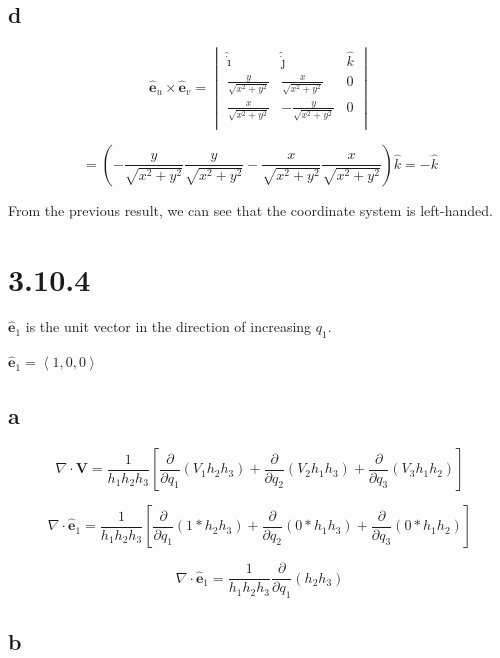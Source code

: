 \documentclass[12pt]{article}
\begin{document}
\subsection{d}

\[
    \hat{\textbf{e}}_u \times \hat{\textbf{e}}_v =
    \begin{vmatrix}
        \hat{\dot{\imath}}         & \hat{\dot{\jmath}}          & \hat{k} \\
        \frac{y}{\sqrt{x^2 + y^2}} & \frac{x}{\sqrt{x^2 + y^2}}  & 0       \\
        \frac{x}{\sqrt{x^2 + y^2}} & -\frac{y}{\sqrt{x^2 + y^2}} & 0       \\
    \end{vmatrix}
\]

\[
    = \left( - \frac{y}{\sqrt{x^2 + y^2}} \frac{y}{\sqrt{x^2 + y^2}} - \frac{x}{\sqrt{x^2 + y^2}} \frac{x}{\sqrt{x^2 + y^2}} \right)\hat{k} = -\hat{k}
\]

From the previous result, we can see that the coordinate system is left-handed.

\section{3.10.4}

\(\hat{\textbf{e}}_1\) is the unit vector in the direction of increasing \(q_1\).

\(\hat{\textbf{e}}_1 = \left\langle1, 0, 0\right\rangle \)

\subsection{a}

\[
    \nabla \cdot \textbf{V} = \frac{1}{h_1 h_2 h_3}\left[\frac{\partial}{\partial q_1}\left(V_1 h_2 h_3\right) + \frac{\partial}{\partial q_2}\left(V_2 h_1 h_3\right) + \frac{\partial}{\partial q_3}\left(V_3 h_1 h_2\right)\right]
\]

\[
    \nabla \cdot \hat{\textbf{e}}_1 = \frac{1}{h_1 h_2 h_3}\left[\frac{\partial}{\partial q_1}\left(1 * h_2 h_3\right) + \frac{\partial}{\partial q_2}\left(0 * h_1 h_3\right) + \frac{\partial}{\partial q_3}\left(0 * h_1 h_2\right)\right]
\]

\[
    \nabla \cdot \hat{\textbf{e}}_1 = \frac{1}{h_1 h_2 h_3} \frac{\partial}{\partial q_1}\left(h_2 h_3\right)
\]

\subsection{b}
\end{document}
